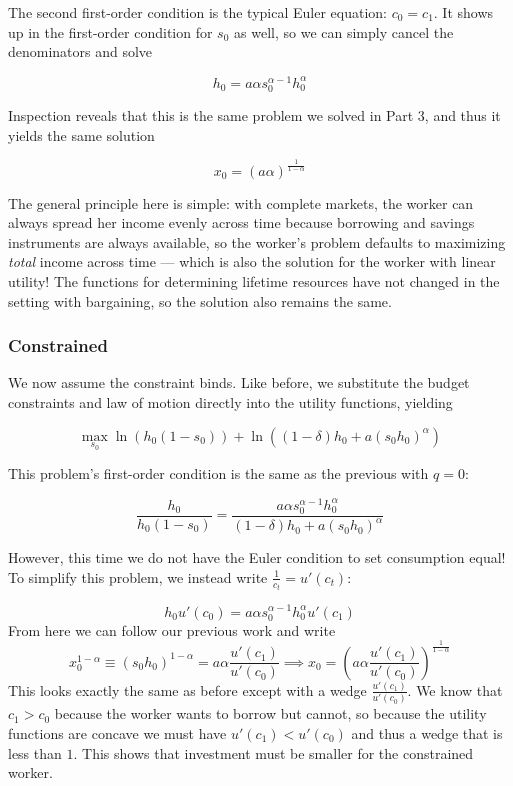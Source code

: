 \documentclass[12pt, letterpaper, parskip = full]{article}
\begin{document}
    The second first-order condition is the typical Euler equation: \(c_0 = c_1\). It shows up in the first-order condition for \(s_0\) as well, so we can simply cancel the denominators and solve

    \[ h_0 = a \alpha s_0^{\alpha - 1} h_0^\alpha  \]

    Inspection reveals that this is the same problem we solved in Part 3, and thus it yields the same solution 

    \[ x_0 = (a \alpha)^{\frac{1}{1 - \alpha}}  \]

    The general principle here is simple: with complete markets, the worker can always spread her income evenly across time because borrowing and savings instruments are always available, so the worker's problem defaults to maximizing \emph{total} income across time --- which is also the solution for the worker with linear utility! The functions for determining lifetime resources have not changed in the setting with bargaining, so the solution also remains the same.

    \subsubsection{Constrained}

    We now assume the constraint binds. Like before, we substitute the budget constraints and law of motion directly into the utility functions, yielding 

    \[  \max_{s_0} \ln\left(h_0(1-s_0)\right) + \ln\left((1-\delta) h_0 + a (s_0 h_0)^\alpha\right)   \]

    This problem's first-order condition is the same as the previous with \(q=0\): 

    \[ \frac{h_0}{h_0 (1 - s_0)} = \frac{a \alpha s_0^{\alpha - 1} h_0^\alpha}{(1-\delta) h_0 + a (s_0 h_0)^\alpha}  \]

    However, this time we do not have the Euler condition to set consumption equal! To simplify this problem, we instead write \(\frac{1}{c_t} = u'(c_t)\):

    \[ h_0 u'(c_0) = a \alpha s_0^{\alpha - 1} h_0^\alpha u'(c_1)  \]
    From here we can follow our previous work and write
    \[ x_0^{1 - \alpha} \equiv (s_0 h_0)^{1 - \alpha} = a \alpha \frac{u'(c_1)}{u'(c_0)} \implies x_0 = \left(a \alpha \frac{u'(c_1)}{u'(c_0)}\right)^{\frac{1}{1-\alpha}}  \]
    This looks exactly the same as before except with a wedge \(\frac{u'(c_1)}{u'(c_0)}\). We know that \(c_1 > c_0\) because the worker wants to borrow but cannot, so because the utility functions are concave we must have \( u'(c_1) < u'(c_0)\) and thus a wedge that is less than \(1\). This shows that investment must be smaller for the constrained worker. 
\end{document}
